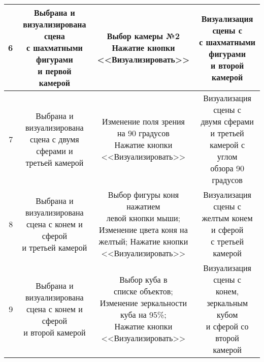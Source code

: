 \begin{longtable}{|r|c|c|c|}
	6 & \makecell{Выбрана и \\визуализирована сцена \\с шахматными фигурами\\и первой камерой} & \makecell{Выбор камеры №2\\Нажатие кнопки\\<<Визуализировать>>} & \makecell{Визуализация сцены с \\с шахматными фигурами\\и второй камерой} \\ \hline
	7 & \makecell{Выбрана и \\визуализирована \\сцена с двумя сферами и \\третьей камерой} & \makecell{Изменение поля зрения\\на 90 градусов\\Нажатие кнопки\\<<Визуализировать>>} & \makecell{Визуализация сцены с \\двумя сферами и третьей\\камерой с углом\\обзора 90 градусов} \\ \hline
	8 & \makecell{Выбрана и \\визуализирована \\сцена с конем и сферой\\и третьей камерой} & \makecell{Выбор фигуры коня нажатием\\левой кнопки мыши;\\Изменение цвета коня на\\ желтый; Нажатие кнопки\\<<Визуализировать>>} & \makecell{Визуализация сцены с \\желтым конем и сферой\\с третьей камерой} \\ \hline
	9 & \makecell{Выбрана и \\визуализирована \\сцена с конем и сферой\\и второй камерой} & \makecell{Выбор куба в \\списке объектов;\\Изменение зеркальности\\куба на 95\%;\\Нажатие кнопки\\<<Визуализировать>>} & \makecell{Визуализация сцены с \\конем, зеркальным кубом\\ и сферой со второй\\камерой} \\ \hline

\end{longtable}
